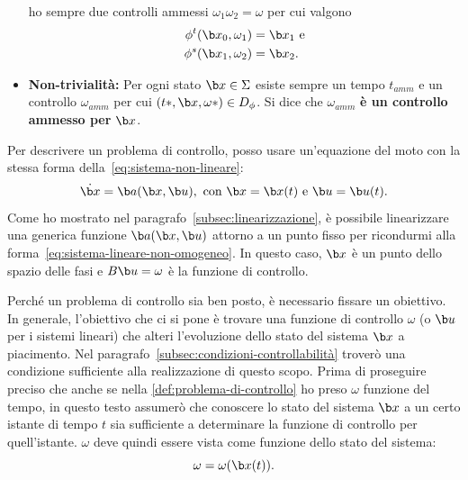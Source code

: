 \begin{definition}
\begin{itemize}
            ho sempre due controlli ammessi $\omega_1 \omega_2 = \omega$ per
            cui valgono
            \begin{align*}
            \phi^t(\b x_0, \omega_1) &= \b x_1 \text{ e}\\
            \phi^s(\b x_1, \omega_2) &= \b x_2.
            \end{align*}
        \item \textbf{Non-trivialità:}
            Per ogni stato $\b x \in \Sigma$ esiste sempre un tempo $t_{amm}$ e un
            controllo $\omega_{amm}$ per cui $(t*, \b x, \omega*) \in D_\phi$.
        Si dice che $\omega_{amm}$ \textbf{è un controllo ammesso per} $\b x$.
    \end{itemize}
    \label{def:problema-di-controllo}
\end{definition}

Per descrivere un problema di controllo, posso usare un'equazione del moto con la stessa forma
della~\eqref{eq:sistema-non-lineare}:
\begin{equation*}
    \dot {\b x} = \b a(\b x, \b u),\ \text{con } \b x = \b x(t)\ \text e\ \b u = \b u(t).
\end{equation*}
Come ho mostrato nel paragrafo~\ref{subsec:linearizzazione}, è possibile linearizzare
una generica funzione $\b a(\b x, \b u)$ attorno a un punto fisso per ricondurmi alla
forma~\eqref{eq:sistema-lineare-non-omogeneo}.
In questo caso, $\b x$ è un punto dello spazio delle fasi e $B\b u = \omega$ è la funzione
di controllo.

Perché un problema di controllo sia ben posto, è necessario fissare un obiettivo.
In generale, l'obiettivo che ci si pone è trovare una funzione di controllo $\omega$
(o $\b u$ per i sistemi lineari) che alteri l'evoluzione dello stato del sistema $\b x$ a piacimento.
Nel paragrafo~\ref{subsec:condizioni-controllabilità} troverò una condizione sufficiente
alla realizzazione di questo scopo.
Prima di proseguire preciso che anche se nella \autoref{def:problema-di-controllo}
ho preso $\omega$ funzione del tempo,
in questo testo assumerò che conoscere lo stato del sistema $\b x$
a un certo istante di tempo $t$ sia sufficiente a determinare la funzione di controllo
per quell'istante. $\omega$ deve quindi essere vista come funzione dello stato
del sistema:
\begin{equation*}
    \omega = \omega(\b x(t)).
\end{equation*}

